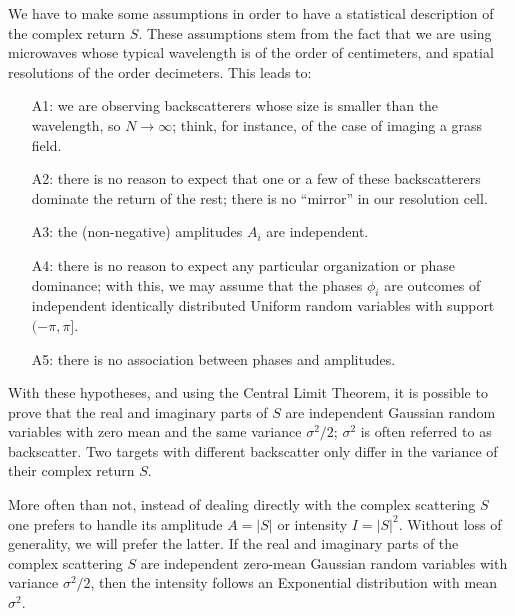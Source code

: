 \documentclass{beamer}
\begin{document}
\begin{frame}[allowframebreaks]
We have to make some assumptions in order to have a statistical description of the complex return $S$.
These assumptions stem from the fact that we are using microwaves whose typical wavelength is of the order of centimeters, and spatial resolutions of the order decimeters.
This leads to:
\begin{small}
\begin{itemize}
\item[A1:] we are observing backscatterers whose size is smaller than the wavelength, so $N\to\infty$; think, for instance, of the case of imaging a grass field.
\item[A2:] there is no reason to expect that one or a few of these backscatterers dominate the return of the rest; there is no ``mirror'' in our resolution cell.
\item[A3:] the (non-negative) amplitudes $A_i$ are independent.
\item[A4:] there is no reason to expect any particular organization or phase dominance; with this, we may assume that the phases $\phi_i$ are outcomes of independent identically distributed Uniform random variables with support $(-\pi,\pi]$.
\item[A5:] there is no association between phases and amplitudes.
\end{itemize}
\end{small}
With these hypotheses, and using the Central Limit Theorem,	 it is possible to prove that the real and imaginary parts of $S$ are independent Gaussian random variables with zero mean and the same variance $\sigma^2/2$; $\sigma^2$ is often referred to as backscatter.
Two targets with different backscatter only differ in the variance of their complex return $S$.

\end{frame} 

\begin{frame}[allowframebreaks]

More often than not, instead of dealing directly with the complex scattering $S$ one prefers to handle its amplitude $A=|S|$ or intensity $I=|S|^2$.
Without loss of generality, we will prefer the latter.
If the real and imaginary parts of the complex scattering $S$ are independent zero-mean Gaussian random variables with variance $\sigma^2/2$, then the intensity follows an Exponential distribution with mean $\sigma^2$.
\end{frame}
\end{document}
